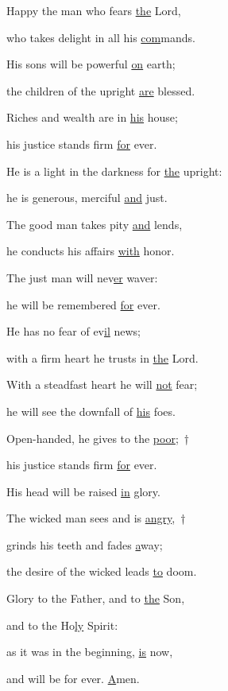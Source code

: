 \noindent Happy the man who fears \uline{the} Lord,~\GreStar{}~\nopagebreak

who takes delight in all his \uline{com}mands.

\noindent His sons will be powerful \uline{on} earth;~\GreStar{}~\nopagebreak

the children of the upright \uline{are} blessed.

\noindent Riches and wealth are in \uline{his} house;~\GreStar{}~\nopagebreak

his justice stands firm \uline{for} ever.

\noindent He is a light in the darkness for \uline{the} upright:~\GreStar{}~\nopagebreak

he is generous, merciful \uline{and} just.

\noindent The good man takes pity \uline{and} lends,~\GreStar{}~\nopagebreak

he conducts his affairs \uline{with} honor.

\noindent The just man will nev\uline{er} waver:~\GreStar{}~\nopagebreak

he will be remembered \uline{for} ever.

\noindent He has no fear of ev\uline{il} news;~\GreStar{}~\nopagebreak

with a firm heart he trusts in \uline{the} Lord.

\noindent With a steadfast heart he will \uline{not} fear;~\GreStar{}~\nopagebreak

he will see the downfall of \uline{his} foes.

\noindent Open-handed, he gives to the \uline{poor};~†~\nopagebreak

his justice stands firm \uline{for} ever.~\GreStar{}~\nopagebreak

His head will be raised \uline{in} glory.

\noindent The wicked man sees and is \uline{angry},~†~\nopagebreak

grinds his teeth and fades \uline{a}way;~\GreStar{}~\nopagebreak

the desire of the wicked leads \uline{to} doom.

\noindent Glory to the Father, and to \uline{the} Son,~\GreStar{}~\nopagebreak

and to the Ho\uline{ly} Spirit:

\noindent as it was in the beginning, \uline{is} now,~\GreStar{}~\nopagebreak

and will be for ever. \uline{A}men.
